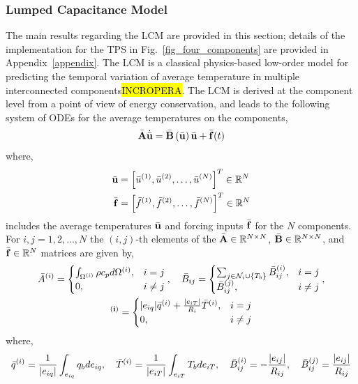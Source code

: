 \subsubsection{Lumped Capacitance Model}
The main results regarding the LCM are provided in this section; details of the implementation for the TPS in Fig.~\ref{fig_four_components} are provided in Appendix~\ref{appendix}. The LCM is a classical physics-based low-order model for predicting the temporal variation of average temperature in multiple interconnected components\hl{INCROPERA}. The LCM is derived at the component level from a point of view of energy conservation, and leads to the following system of ODEs for the average temperatures on the components,
\begin{equation}
    \bar{\mathbf{A}}\dot{\bar{\mathbf{u}}} = \bar{\mathbf{B}}\left(\bar{\mathbf{u}}\right)\bar{\mathbf{u}} + \bar{\mathbf{f}}(t)\label{eqn_lcm}
\end{equation}
where,
\begin{subequations}
    \begin{align}
       \bar{\mathbf{u}} &= \left[\bar{u}^{(1)},\bar{u}^{(2)},\dots,\bar{u}^{(N)}\right]^T\in\mathbb{R}^{N}\\
        \bar{\mathbf{f}} &= \left[\bar{f}^{(1)},\bar{f}^{(2)},\dots,\bar{f}^{(N)}\right]^T\in\mathbb{R}^{N}
    \end{align}
\end{subequations}
includes the average temperatures $\bar{\mathbf{u}}$ and forcing inputs $\bar{\mathbf{f}}$ for the $N$ components. For $i,j=1,2,\dots,N$ the $(i,j)$-th elements of the $\bar{\mathbf{A}}\in\mathbb{R}^{N\times N}$, $\bar{\mathbf{B}}\in\mathbb{R}^{N\times N}$, and $\bar{\mathbf{f}}\in\mathbb{R}^{N}$ matrices are given by,
\begin{subequations}
    \begin{gather}
        \bar{A}^{(i)} = \begin{cases}
                \int_{\Omega^{(i)}}\rho c_p d\Omega^{(i)}, & i=j\\
                0, & i\neq j
            \end{cases},\quad \bar{B}_{ij} = \begin{cases}
            \sum_{j\in\mathcal{N}_i\cup\left\{T_b\right\}}\bar{B}^{(i)}_{ij}, &i=j \\
            \bar{B}^{(j)}_{ij}, & i\neq j
        \end{cases},\\ \bf^{(i)} = \begin{cases}
            |e_{iq}|\bar{q}^{(i)} + \frac{|e_{iT}|}{R_{i}}\bar{T}^{(i)}, & i=j \\ 
            0, & i\neq j
        \end{cases}
    \end{gather}\label{eqn_lcm_matrices}
\end{subequations}
where,
\begin{equation}
    \bar{q}^{(i)} = \frac{1}{|e_{iq}|}\int_{e_{iq}} q_b de_{iq},\quad \bar{T}^{(i)} = \frac{1}{|e_{iT}|}\int_{e_{iT}}T_b de_{iT},\quad \bar{B}^{(i)}_{ij} = -\frac{|e_{ij}|}{R_{ij}},\quad \bar{B}_{ij}^{(j)} = \frac{|e_{ij}|}{R_{ij}}\label{eqn_lcm_matrices_elements}
\end{equation}

